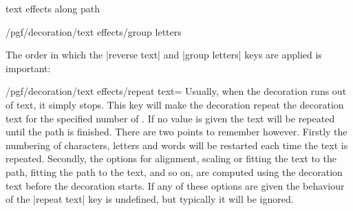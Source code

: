 \begin{decoration}{text effects along path}
\begin{key}{/pgf/decoration/text effects/group letters}
\begin{codeexample}[]
\end{codeexample}
    \end{key}

    The order in which the |reverse text| and |group letters| keys are applied
    is important:
\begin{codeexample}[]
\end{codeexample}

    \begin{key}{/pgf/decoration/text effects/repeat text=}
        Usually, when the decoration runs out of text, it simply stops. This
        key will make the decoration repeat the decoration text for the
        specified number of . If no value is given the text will be
        repeated until the path is finished. There are two points to remember
        however. Firstly the numbering of characters, letters and words will be
        restarted each time the text is repeated. Secondly, the options for
        alignment, scaling or fitting the text to the path, fitting the path to
        the text, and so on, are computed using the decoration text before the
        decoration starts. If any of these options are given the behaviour of
        the |repeat text| key is undefined, but typically it will be ignored.
\begin{codeexample}[]
\end{codeexample}
    \end{key}


\end{decoration}
